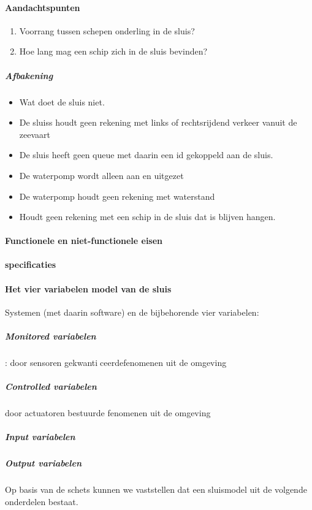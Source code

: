 \paragraph{Aandachtspunten}
\begin{enumerate}
	\item Voorrang tussen schepen onderling in de sluis?
	\item Hoe lang mag een schip zich in de sluis bevinden?
\end{enumerate} 




\subparagraph{Afbakening}
\begin{itemize}
	\item Wat doet de sluis niet.
	\item De sluiss houdt geen rekening met links of rechtsrijdend verkeer vanuit de zeevaart
	\item De sluis heeft geen queue met daarin een id gekoppeld aan de sluis.
	\item De waterpomp wordt alleen aan en uitgezet
	\item De waterpomp houdt geen rekening met waterstand
	\item Houdt geen rekening met een schip in de sluis dat is blijven hangen.
	
\end{itemize}

\paragraph{Functionele en niet-functionele eisen}

\paragraph{specificaties}

\paragraph{Het vier variabelen model van de sluis}
Systemen (met daarin software) en de bijbehorende vier variabelen:
\subparagraph{Monitored variabelen}
: door sensoren gekwanticeerdefenomenen uit de omgeving
\subparagraph{Controlled variabelen}
door actuatoren bestuurde fenomenen uit de omgeving
\subparagraph{Input variabelen}
\subparagraph{Output variabelen}







Op basis van de schets kunnen we vaststellen dat een sluismodel uit de volgende onderdelen bestaat.

